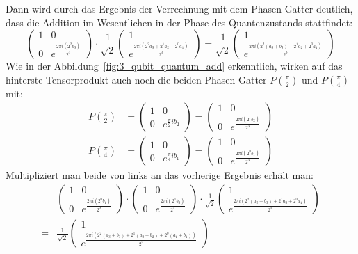 Dann wird durch das Ergebnis der Verrechnung mit dem Phasen-Gatter deutlich, 
dass die Addition im Wesentlichen in der Phase des Quantenzustands stattfindet:
\[\begin{pmatrix}
    1 & 0 \\
    0 & e^{\frac{2\pi i (2^2b_3)}{2^3}}
  \end{pmatrix}
    \cdot
\frac{1}{\sqrt{2}}
\begin{pmatrix}
    1  \\
     e^{\frac{2 \pi i (2^{2}a_3 +2^1a_2+2^0a_1)}{2^3}}
  \end{pmatrix}
  =
  \frac{1}{\sqrt{2}}
  \begin{pmatrix}
    1  \\
     e^{\frac{2 \pi i (2^{2}(a_3+b_3) +2^1a_2+2^0a_1)}{2^3}}
  \end{pmatrix}
\]
Wie in der Abbildung~\ref{fig:3_qubit_quantum_add} erkenntlich,
wirken auf das hinterste Tensorprodukt auch noch die beiden Phasen-Gatter \(P(\frac{\pi}{2})\) und \(P(\frac{\pi}{4})\) mit:
\begin{align*}
    P\left(\frac{\pi}{2}\right) &= 
\begin{pmatrix}
    1 & 0 \\
    0 & e^{\frac{\pi}{2} i b_2}
  \end{pmatrix}
  =
  \begin{pmatrix}
    1 & 0 \\
    0 & e^{\frac{2\pi i (2^1b_2)}{2^3}}
  \end{pmatrix} \\
P\left(\frac{\pi}{4}\right) &= 
\begin{pmatrix}
    1 & 0 \\
    0 & e^{\frac{\pi}{4} i b_1}
  \end{pmatrix}
  =
  \begin{pmatrix}
    1 & 0 \\
    0 & e^{\frac{2\pi i (2^0b_1)}{2^3}}
  \end{pmatrix}
\end{align*}
Multipliziert man beide von links an das vorherige Ergebnis erhält man:
\begin{align*}
    &\begin{pmatrix}
        1 & 0 \\
        0 & e^{\frac{2\pi i (2^0b_1)}{2^3}}
      \end{pmatrix}
      \cdot
      \begin{pmatrix}
        1 & 0 \\
        0 & e^{\frac{2\pi i (2^1b_2)}{2^3}}
      \end{pmatrix}
      \cdot
      \frac{1}{\sqrt{2}}
      \begin{pmatrix}
        1  \\
         e^{\frac{2 \pi i (2^{2}(a_3+b_3) +2^1a_2+2^0a_1)}{2^3}} 
      \end{pmatrix} 
     \\
      =&
      \frac{1}{\sqrt{2}}
      \begin{pmatrix}
        1  \\
         e^{\frac{2 \pi i (2^{2}(a_3+b_3) +2^1(a_2+b_2)+2^0(a_1+b_1))}{2^3}}
      \end{pmatrix}
\end{align*}
